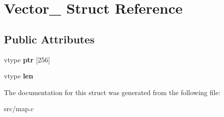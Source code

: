 \hypertarget{structVector__}{}\section{Vector\+\_\+ Struct Reference}
\label{structVector__}
\subsection*{Public Attributes}
\begin{DoxyCompactItemize}
\item 
\hypertarget{structVector___a0c44801bf9e0207a5a7f7c6ba830ddd7}{}\label{structVector___a0c44801bf9e0207a5a7f7c6ba830ddd7} 
vtype {\bfseries ptr} \mbox{[}256\mbox{]}
\item 
\hypertarget{structVector___a3c450a447c20879106fc7979b0ffe9e5}{}\label{structVector___a3c450a447c20879106fc7979b0ffe9e5} 
vtype {\bfseries len}
\end{DoxyCompactItemize}


The documentation for this struct was generated from the following file\+:\begin{DoxyCompactItemize}
\item 
src/map.\+c\end{DoxyCompactItemize}
